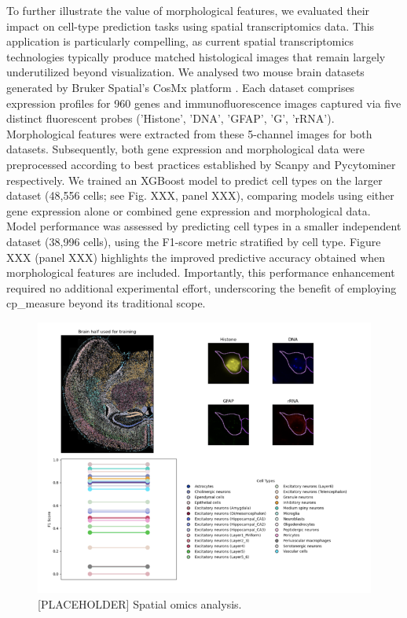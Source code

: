 \documentclass{article}
\begin{document}
To further illustrate the value of morphological features, we evaluated their impact on cell-type prediction tasks using spatial transcriptomics data. This application is particularly compelling, as current spatial transcriptomics technologies typically produce matched histological images that remain largely underutilized beyond visualization. We analysed two mouse brain datasets generated by Bruker Spatial's CosMx platform \citep{CosMxSMIMouse2025}. Each dataset comprises expression profiles for 960 genes and immunofluorescence images captured via five distinct fluorescent probes ('Histone', 'DNA', 'GFAP', 'G', 'rRNA'). Morphological features were extracted from these 5-channel images for both datasets. Subsequently, both gene expression and morphological data were preprocessed according to best practices established by Scanpy \citep{wolfSCANPYLargescaleSinglecell2018} and Pycytominer \citep{serranoReproducibleImagebasedProfiling2025} respectively. We trained an XGBoost model to predict cell types on the larger dataset (48,556 cells; see Fig. XXX, panel XXX), comparing models using either gene expression alone or combined gene expression and morphological data. Model performance was assessed by predicting cell types in a smaller independent dataset (38,996 cells), using the F1-score metric stratified by cell type. Figure XXX (panel XXX) highlights the improved predictive accuracy obtained when morphological features are included. Importantly, this performance enhancement required no additional experimental effort, underscoring the benefit of employing cp\_measure beyond its traditional scope.

\begin{figure}[htbp]
\centering
\includegraphics[width=.9\linewidth]{./figs/spatial.png}
\caption{\label{fig:spatial_omics}{[}PLACEHOLDER] Spatial omics analysis.}
\end{figure}
\end{document}
